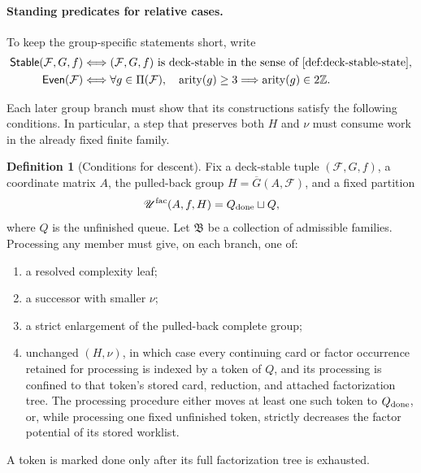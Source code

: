 \documentclass[11pt,letterpaper,onecolumn]{article}
\theoremstyle{plain}
\theoremstyle{definition}
\newtheorem{definition}[definition]{Definition}
\theoremstyle{remark}
\newcommand{\cF}{\mathcal F}
\newcommand{\Stable}{\mathsf{Stable}}
\newcommand{\Even}{\mathsf{Even}}
\newcommand{\arity}{\operatorname{arity}}
\begin{document}
\paragraph{Standing predicates for relative cases.}
To keep the group-specific statements short, write
\hypertarget{eq:stable-predicate}{}
\hypertarget{eq:even-prime-predicate}{}
\begin{align*}
 \Stable(\cF,G,f)
 &\Longleftrightarrow
   (\cF,G,f)\text{ is deck-stable in the sense of
   \cref{def:deck-stable-state}},
   \\
 \Even(\cF)
 &\Longleftrightarrow
   \forall g\in\Pi(\cF),\quad
   \arity(g)\ge3\Longrightarrow \arity(g)\in2\mathbb Z.
\end{align*}

Each later group branch must show that its constructions satisfy the
following conditions. In particular, a step that preserves both \(H\)
and \(\nu\) must consume work in the already fixed finite family.

\begin{definition}[Conditions for descent]
\label{def:frozen-token-coverage}
Fix a deck-stable tuple \((\cF,G,f)\), a coordinate matrix \(A\), the
pulled-back group \(H=\overline G(A,\cF)\), and a fixed partition
\[
 \mathscr U^{\mathrm{fac}}(A,f,H)=Q_{\rm done}\sqcup Q,
\]
where \(Q\) is the unfinished queue.  Let \(\mathfrak B\) be a collection of admissible families.  Processing any
member must give, on each branch, one of:
\begin{enumerate}
\item a resolved complexity leaf;
\item a successor with smaller \(\nu\);
\item a strict enlargement of the pulled-back complete group;
\item unchanged \((H,\nu)\), in which case every continuing card or factor occurrence retained for processing is indexed by a token of \(Q\), and its processing is
      confined to that token's stored card, reduction, and attached factorization tree.  The processing procedure either moves at least one such token to
      \(Q_{\rm done}\), or, while processing one fixed unfinished token,
      strictly decreases the factor potential of its stored worklist.
\end{enumerate}
 A token is marked done only after its full factorization tree is exhausted.
\end{definition}
\end{document}
